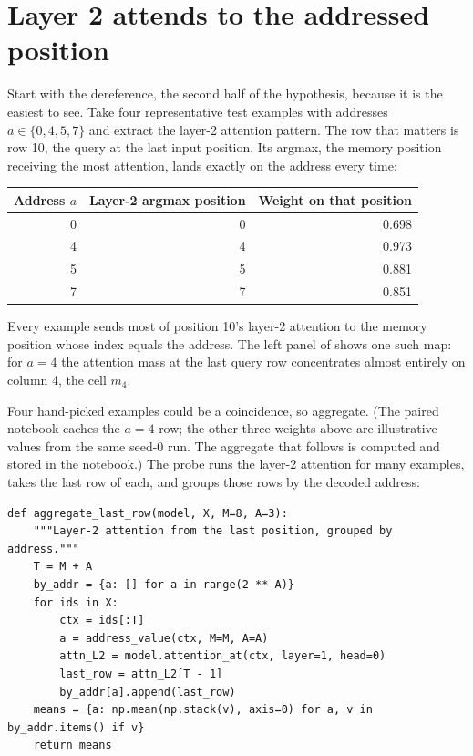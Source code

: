 
\section{Layer 2 attends to the addressed position}\label{sec:layer2-deref}

Start with the dereference, the second half of the hypothesis, because it is the
easiest to see. Take four representative test examples with addresses
$a \in \{0, 4, 5, 7\}$ and extract the layer-2 attention pattern. The row that
matters is row 10, the query at the last input position. Its argmax, the memory
position receiving the most attention, lands exactly on the address every time:

\begin{center}
\begin{tabular}{@{}rrr@{}}
\toprule
Address $a$ & Layer-2 argmax position & Weight on that position \\
\midrule
0 & 0 & 0.698 \\
4 & 4 & 0.973 \\
5 & 5 & 0.881 \\
7 & 7 & 0.851 \\
\bottomrule
\end{tabular}
\end{center}

Every example sends most of position 10's layer-2 attention to the memory
position whose index equals the address. The left panel of
 shows one such map: for $a = 4$ the attention mass at
the last query row concentrates almost entirely on column 4, the cell $m_4$.

Four hand-picked examples could be a coincidence, so aggregate. (The paired
notebook caches the $a = 4$ row; the other three weights above are illustrative
values from the same seed-0 run. The aggregate that follows is computed and
stored in the notebook.) The probe runs the layer-2 attention for many examples,
takes the last row of each, and groups those rows by the decoded address:

\begin{lstlisting}
def aggregate_last_row(model, X, M=8, A=3):
    """Layer-2 attention from the last position, grouped by address."""
    T = M + A
    by_addr = {a: [] for a in range(2 ** A)}
    for ids in X:
        ctx = ids[:T]
        a = address_value(ctx, M=M, A=A)
        attn_L2 = model.attention_at(ctx, layer=1, head=0)
        last_row = attn_L2[T - 1]
        by_addr[a].append(last_row)
    means = {a: np.mean(np.stack(v), axis=0) for a, v in by_addr.items() if v}
    return means
\end{lstlisting}


